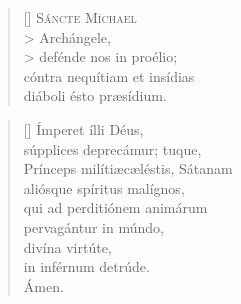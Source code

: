 \documentclass[omni.tex]{subfiles}
\begin{document}
\settowidth{\versewidth}{Et ne nos ind\'ucas in tentati\'onem}

\begin{verse}[\versewidth]
\lettrine[lhang=1.0,nindent=0em]{S}{\'ancte M\'ichael} \\>
Arch\'angele, \\>
def\'ende nos in pro\'elio; \\
c\'ontra nequ\'itiam et ins\'idias \\
di\'aboli \'esto pr\ae s\'idium.
\end{verse}

\begin{verse}[\versewidth]
\'Imperet \'illi D\'eus, \\
s\'upplices deprec\'amur; tuque, \\
Pr\'inceps mil\'iti\ae c\ae l\'estis, 
S\'atanam \\
ali\'osque sp\'iritus mal\'ignos, \\
qui ad perditi\'onem anim\'arum \\
pervag\'antur in m\'undo, \\ 
div\'ina virt\'ute, \\
in inf\'ernum detr\'ude. \\
\'Amen. \\[0\baselineskip]
\end{verse}

\pagebreak
\end{document}

